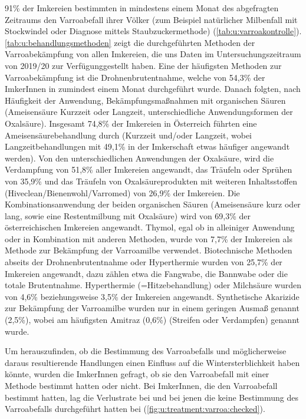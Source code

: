 91\% der Imkereien bestimmten in mindestens einem Monat des abgefragten Zeitraums den Varroabefall ihrer Völker (zum Beispiel natürlicher Milbenfall mit Stockwindel oder Diagnose mittels Staubzuckermethode) (\cref{tab:u:varroakontrolle}). 
\newline
\cref{tab:u:behandlungsmethoden} zeigt die durchgeführten Methoden der Varroabekämpfung von allen Imkereien, die uns Daten im Untersuchungszeitraum von 2019/20 zur Verfügunggestellt haben.
\newline
Eine der häufigsten Methoden zur Varroabekämpfung ist die Drohnenbrutentnahme, welche von 54,3\% der ImkerInnen in zumindest einem Monat durchgeführt wurde. Danach folgten, nach Häufigkeit der Anwendung, Bekämpfungsmaßnahmen mit organischen Säuren (Ameisensäure Kurzzeit oder Langzeit, unterschiedliche Anwendungsformen der Oxalsäure). Insgesamt 74,8\% der Imkereien in Österreich führten eine Ameisensäurebehandlung durch (Kurzzeit und/oder Langzeit, wobei Langzeitbehandlungen mit 49,1\% in der Imkerschaft etwas häufiger angewandt werden). Von den unterschiedlichen Anwendungen der Oxalsäure, wird die Verdampfung von 51,8\% aller Imkereien angewandt, das Träufeln oder Sprühen von 35,9\% und das Träufeln von Oxalsäureprodukten mit weiteren Inhaltsstoffen (Hiveclean/Bienenwohl/Varromed) von 26,9\% der Imkereien. Die Kombinationsanwendung der beiden organischen Säuren (Ameisensäure kurz oder lang, sowie eine Restentmilbung mit Oxalsäure) wird von 69,3\% der österreichischen Imkereien angewandt. Thymol, egal ob in alleiniger Anwendung oder in Kombination mit anderen Methoden, wurde von 7,7\% der Imkereien als Methode zur Bekämpfung der Varroamilbe verwendet. Biotechnische Methoden abseits der Drohnenbrutentnahme oder Hyperthermie wurden von 25,7\% der Imkereien angewandt, dazu zählen etwa die Fangwabe, die Bannwabe oder die totale Brutentnahme. Hyperthermie (=Hitzebehandlung) oder Milchsäure wurden von 4,6\% beziehungsweise 3,5\% der Imkereien angewandt. Synthetische Akarizide zur Bekämpfung der Varroamilbe wurden nur in einem geringen Ausmaß genannt (2,5\%), wobei am häufigsten Amitraz (0,6\%) (Streifen oder Verdampfen) genannt wurde.






Um herauszufinden, ob die Bestimmung des Varroabefalls und möglicherweise daraus resultierende Handlungen einen Einfluss auf die Wintersterblichkeit haben könnte, wurden die ImkerInnen gefragt, ob sie den Varroabefall mit einer Methode bestimmt hatten oder nicht. Bei ImkerInnen, die den Varroabefall bestimmt hatten, lag die Verlustrate bei  und bei jenen die keine Bestimmung des Varroabefalls durchgeführt hatten bei  (\cref{fig:u:treatment:varroa:checked}).

